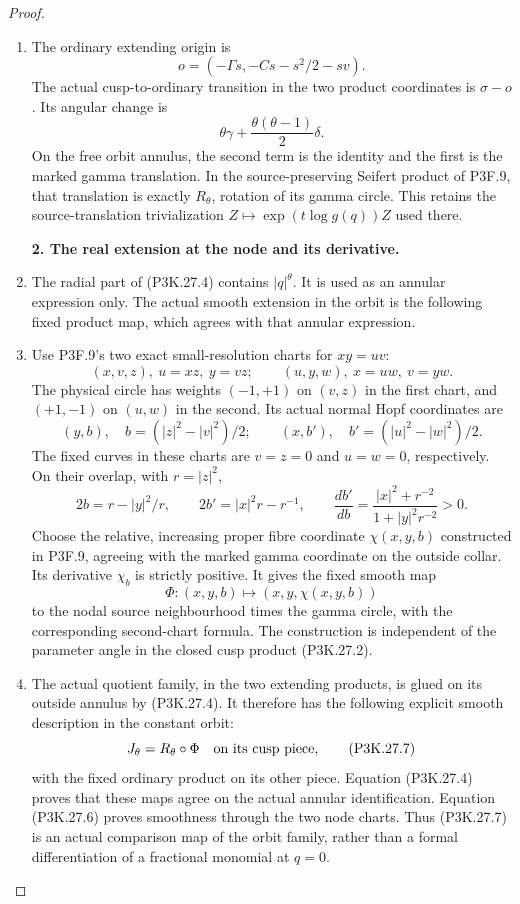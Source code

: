 \begin{proof}
\begin{enumerate}[label=\arabic*.]
\item The ordinary extending origin is
\[
                  o=(-\Gamma s,-Cs-s^2/2-sv).
\]
The actual cusp-to-ordinary transition in the two product
coordinates is \(\sigma-o\). Its angular change is
\[
        \theta\gamma+\frac{\theta(\theta-1)}2\delta.
                                                        \tag{P3K.27.4}
\]
On the free orbit annulus, the second term is the identity
and the first is the marked gamma translation. In the
source-preserving Seifert product of P3F.9, that translation
is exactly \(R_\theta\), rotation of its gamma circle.
This retains the source-translation trivialization
\(Z\mapsto\exp(t\log g(q))Z\) used there.

\par\medskip\noindent\textbf{2. The real extension at the node and its derivative.}\enspace

\item The radial part of (P3K.27.4) contains \(|q|^\theta\).
It is used as an annular expression only. The actual smooth
extension in the orbit is the following fixed product map,
which agrees with that annular expression.

\item Use P3F.9's two exact small-resolution charts for
\(xy=uv\):
\[
 (x,v,z),\ u=xz,\ y=vz;\qquad
 (u,y,w),\ x=uw,\ v=yw.
\]
The physical circle has weights \((-1,+1)\) on \((v,z)\)
in the first chart, and \((+1,-1)\) on \((u,w)\) in the
second. Its actual normal Hopf coordinates are
\[
 (y,b),\quad b=(|z|^2-|v|^2)/2;
 \qquad
 (x,b'),\quad b'=(|u|^2-|w|^2)/2.
                                                        \tag{P3K.27.5}
\]
The fixed curves in these charts are \(v=z=0\) and
\(u=w=0\), respectively. On their overlap, with \(r=|z|^2\),
\[
 2b=r-|y|^2/r,\qquad
 2b'=|x|^2r-r^{-1},\qquad
 \frac{db'}{db}
       =\frac{|x|^2+r^{-2}}{1+|y|^2r^{-2}}>0.
                                                        \tag{P3K.27.6}
\]
Choose the relative, increasing proper fibre coordinate
\(\chi(x,y,b)\) constructed in P3F.9, agreeing with the
marked gamma coordinate on the outside collar. Its
derivative \(\chi_b\) is strictly positive. It gives the
fixed smooth map
\[
         \Phi:(x,y,b)\longmapsto(x,y,\chi(x,y,b))
\]
to the nodal source neighbourhood times the gamma circle,
with the corresponding second-chart formula.
The construction is independent of the parameter angle
in the closed cusp product (P3K.27.2).

\item The actual quotient family, in the two extending products,
is glued on its outside annulus by (P3K.27.4). It therefore
has the following explicit smooth description in the
constant orbit:
\[
          J_\theta=R_\theta\circ\Phi
             \quad\hbox{on its cusp piece},             \tag{P3K.27.7}
\]
with the fixed ordinary product on its other piece.
Equation (P3K.27.4) proves that these maps agree on the
actual annular identification. Equation (P3K.27.6) proves
smoothness through the two node charts. Thus (P3K.27.7)
is an actual comparison map of the orbit family, rather
than a formal differentiation of a fractional monomial
at \(q=0\).


\end{enumerate}
\end{proof}
